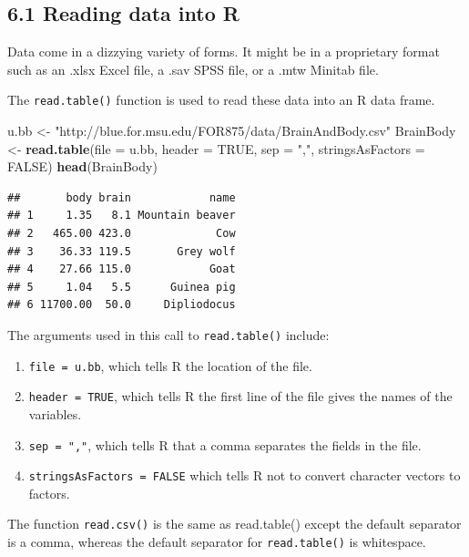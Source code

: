 \documentclass[]{article}
\newenvironment{Shaded}{\begin{snugshade}}{\end{snugshade}}
\newcommand{\KeywordTok}[1]{\textcolor[rgb]{0.13,0.29,0.53}{\textbf{#1}}}
\newcommand{\DataTypeTok}[1]{\textcolor[rgb]{0.13,0.29,0.53}{#1}}
\newcommand{\StringTok}[1]{\textcolor[rgb]{0.31,0.60,0.02}{#1}}
\newcommand{\OtherTok}[1]{\textcolor[rgb]{0.56,0.35,0.01}{#1}}
\newcommand{\NormalTok}[1]{#1}
\providecommand{\tightlist}{%
  \setlength{\itemsep}{0pt}\setlength{\parskip}{0pt}}
\begin{document}
\subsection{6.1 Reading data into R}\label{reading-data-into-r}

Data come in a dizzying variety of forms. It might be in a proprietary
format such as an .xlsx Excel file, a .sav SPSS file, or a .mtw Minitab
file.

The \texttt{read.table()} function is used to read these data into an R
data frame.

\begin{Shaded}
\begin{Highlighting}[]
\NormalTok{u.bb <-}\StringTok{ "http://blue.for.msu.edu/FOR875/data/BrainAndBody.csv"}
\NormalTok{BrainBody <-}\StringTok{ }\KeywordTok{read.table}\NormalTok{(}\DataTypeTok{file =}\NormalTok{ u.bb, }\DataTypeTok{header =} \OtherTok{TRUE}\NormalTok{, }\DataTypeTok{sep =} \StringTok{","}\NormalTok{,}
\DataTypeTok{stringsAsFactors =} \OtherTok{FALSE}\NormalTok{)}
\KeywordTok{head}\NormalTok{(BrainBody)}
\end{Highlighting}
\end{Shaded}

\begin{verbatim}
##       body brain            name
## 1     1.35   8.1 Mountain beaver
## 2   465.00 423.0             Cow
## 3    36.33 119.5       Grey wolf
## 4    27.66 115.0            Goat
## 5     1.04   5.5      Guinea pig
## 6 11700.00  50.0     Dipliodocus
\end{verbatim}

The arguments used in this call to \texttt{read.table()} include:

\begin{enumerate}
\def\labelenumi{\arabic{enumi}.}
\tightlist
\item
  \texttt{file\ =\ u.bb}, which tells R the location of the file.
\item
  \texttt{header\ =\ TRUE}, which tells R the first line of the file
  gives the names of the variables.
\item
  \texttt{sep\ =\ ","}, which tells R that a comma separates the fields
  in the file.
\item
  \texttt{stringsAsFactors\ =\ FALSE} which tells R not to convert
  character vectors to factors.
\end{enumerate}

The function \texttt{read.csv()} is the same as read.table() except the
default separator is a comma, whereas the default separator for
\texttt{read.table()} is whitespace.
\end{document}
